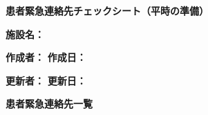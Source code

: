\documentclass[a4paper,12pt]{jarticle}
\newcommand{\underlinespace}[1]{\underline{\hspace{#1}}}
\begin{document}
\begin{center}
{\Large\textbf{患者緊急連絡先チェックシート（平時の準備）}}
\end{center}
\vspace{5mm}

\noindent
\textbf{施設名：} \underlinespace{8cm}

\vspace{3mm}

\noindent
\textbf{作成者：} \underlinespace{4cm} \quad \textbf{作成日：} \underlinespace{3cm}

\vspace{3mm}

\noindent
\textbf{更新者：} \underlinespace{4cm} \quad \textbf{更新日：} \underlinespace{3cm}

\vspace{8mm}

\begin{center}
\textbf{\large 患者緊急連絡先一覧}
\end{center}

\vspace{3mm}
\end{document}
